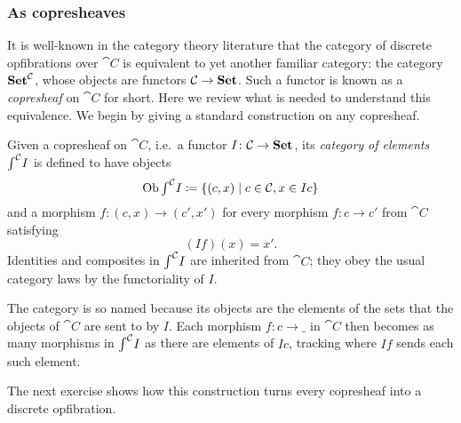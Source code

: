 \documentclass[Book-Poly]{subfiles}
\begin{document}
\subsubsection{As copresheaves}

It is well-known in the category theory literature that the category of discrete opfibrations over $\cat{C}$ is equivalent to yet another familiar category: the category $\mathbf{Set}^{\mathcal{C}}$, whose objects are functors $\mathcal{C}\to\mathbf{Set}$.
Such a functor is known as a \emph{copresheaf} on $\cat{C}$ for short.
Here we review what is needed to understand this equivalence.
We begin by giving a standard construction on any copresheaf.

\begin{definition}\label{def.cat_elements}
Given a copresheaf on $\cat{C}$, i.e.\ a functor $I\colon\mathcal{C}\to\mathbf{Set}$, its \emph{category of elements} $\textstyle{\int}^{\mathcal{C}}I$ is defined to have objects
\[
    \operatorname{Ob}\textstyle{\int}^{\mathcal{C}}I\coloneqq\{(c,x)\mid c\in\mathcal{C}, x\in Ic\}
\]
and a morphism $f\colon(c,x)\to(c',x')$ for every morphism $f\colon c\to c'$ from $\cat{C}$ satisfying
\[
    (If)(x)=x'.
\]
Identities and composites in $\textstyle{\int}^{\mathcal{C}}I$ are inherited from $\cat{C}$; they obey the usual category laws by the functoriality of $I$.

The category is so named because its objects are the elements of the sets that the objects of $\cat{C}$ are sent to by $I$.
Each morphism $f\colon c\to\_$ in $\cat{C}$ then becomes as many morphisms in $\textstyle{\int}^{\mathcal{C}}I$ as there are elements of $Ic$, tracking where $If$ sends each such element.
\end{definition}

The next exercise shows how this construction turns every copresheaf into a discrete opfibration.
\end{document}

